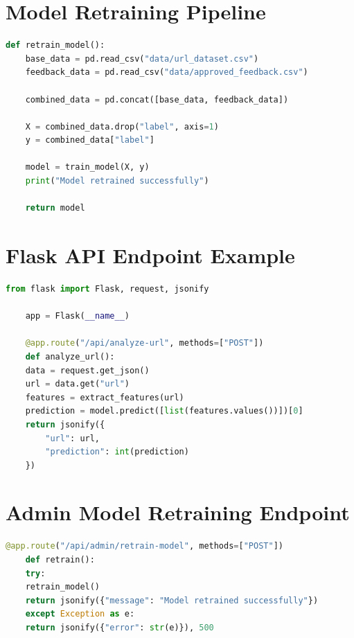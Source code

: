 \section{Model Retraining Pipeline}

\begin{lstlisting}[language=Python, caption=Feedback-based Model Retraining Pipeline, label=lst:retrain_pipeline]
	def retrain_model():
	base_data = pd.read_csv("data/url_dataset.csv")
	feedback_data = pd.read_csv("data/approved_feedback.csv")
	
	combined_data = pd.concat([base_data, feedback_data])
	
	X = combined_data.drop("label", axis=1)
	y = combined_data["label"]
	
	model = train_model(X, y)
	print("Model retrained successfully")
	
	return model
\end{lstlisting}

\section{Flask API Endpoint Example}

\begin{lstlisting}[language=Python, caption=Flask API Endpoint for URL Analysis, label=lst:flask_api]
	from flask import Flask, request, jsonify
	
	app = Flask(__name__)
	
	@app.route("/api/analyze-url", methods=["POST"])
	def analyze_url():
	data = request.get_json()
	url = data.get("url")
	features = extract_features(url)
	prediction = model.predict([list(features.values())])[0]
	return jsonify({
		"url": url,
		"prediction": int(prediction)
	})
\end{lstlisting}

\section{Admin Model Retraining Endpoint}

\begin{lstlisting}[language=Python, caption=Admin Endpoint for Model Retraining, label=lst:admin_retrain]
	@app.route("/api/admin/retrain-model", methods=["POST"])
	def retrain():
	try:
	retrain_model()
	return jsonify({"message": "Model retrained successfully"})
	except Exception as e:
	return jsonify({"error": str(e)}), 500
\end{lstlisting}
